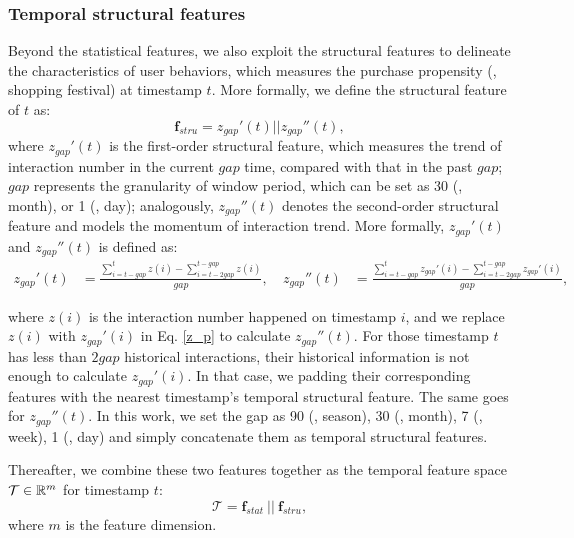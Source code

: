 \subsubsection{\textbf{Temporal structural features}}
Beyond the statistical features, we also exploit the structural features to delineate the characteristics of user behaviors, which measures the purchase propensity (\eg, shopping festival) at timestamp $t$.
More formally, we define the structural feature of $t$ as:
\begin{equation}
	\boldsymbol{f}_{stru} = z_{gap}'(t) || z_{gap}''(t),
\end{equation}
where $z_{gap}'(t)$ is the first-order structural feature, which measures the trend of interaction number in the current $gap$ time, compared with that in the past $gap$; $gap$ represents the granularity of window period, which can be set as 30 (\ie, month), or 1 (\ie, day); analogously, $z_{gap}''(t)$ denotes the second-order structural feature and models the momentum of interaction trend.
More formally, $z_{gap}'(t)$ and $z_{gap}''(t)$ is defined as:
\begin{align}  \label{z_p}
	 z_{gap}'(t) &= \frac{\sum_{i=t-gap}^{t}z(i) - \sum_{i=t-2gap}^{t-gap}z(i)}{gap},\ & z_{gap}''(t) &= \frac{\sum_{i=t-gap}^{t}z_{gap}'(i) - \sum_{i=t-2gap}^{t-gap}z_{gap}'(i)}{gap},
\end{align}

where $z(i)$ is the interaction number happened on timestamp $i$, and we replace $z(i)$ with $z_{gap}'(i)$ in Eq. \ref{z_p} to calculate $z_{gap}''(t)$.
For those timestamp $t$ has less than $2gap$ historical interactions, their historical information is not enough to calculate $z_{gap}'(i)$.
In that case, we padding their corresponding features with the nearest timestamp's temporal structural feature. The same goes for $z_{gap}''(t)$.
In this work, we set the gap as 90 (\ie, season), 30 (\ie, month), 7 (\ie, week), 1 (\ie, day) and simply concatenate them as temporal structural features.

Thereafter, we combine these two features together as the temporal feature space $\mathcal{T} \in \mathbb{R}^m$ for timestamp $t$:
\begin{equation}
	\mathcal{T} = \boldsymbol{f}_{stat} \ || \ \boldsymbol{f}_{stru},
\end{equation}
where $m$ is the feature dimension.


